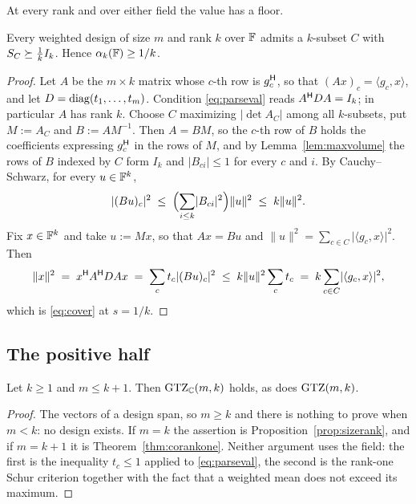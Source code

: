 At every rank and over either field the value has a floor.

\begin{proposition}[Lean]\label{prop:rankfloor}
Every weighted design of size $m$ and rank $k$ over $\mathbb{F}$ admits a
$k$-subset $C$ with $S_{C}\succeq\frac1k I_k$.  Hence $\alpha_k(\mathbb{F})\ge1/k$.
\end{proposition}

\begin{proof}
Let $A$ be the $m\times k$ matrix whose $c$-th row is $g_c^{\mathsf{H}}$, so that
$(Ax)_c=\langle g_c,x\rangle$, and let $D=\operatorname{diag}(t_1,\dots,t_m)$.
Condition \eqref{eq:parseval} reads $A^{\mathsf{H}} DA=I_k$; in particular $A$ has
rank $k$.  Choose $C$ maximizing $\lvert\det A_C\rvert$ among all
$k$-subsets, put $M:=A_C$ and $B:=AM^{-1}$.  Then $A=BM$, so the $c$-th
row of $B$ holds the coefficients expressing $g_c^{\mathsf{H}}$ in the rows of $M$,
and by Lemma~\ref{lem:maxvolume} the rows of $B$ indexed by $C$ form $I_k$
and $\lvert B_{ci}\rvert\le1$ for every $c$ and $i$.  By
Cauchy--Schwarz, for every $u\in\mathbb{F}^k$,
\[
  \lvert (Bu)_c\rvert^{2}
  \;\le\;\Bigl(\sum_{i\le k}\lvert B_{ci}\rvert^{2}\Bigr)\lVert u\rVert^{2}
  \;\le\;k\lVert u\rVert^{2} .
\]
Fix $x\in\mathbb{F}^k$ and take $u:=Mx$, so that $Ax=Bu$ and
$\lVert u\rVert^2=\sum_{c\in C}\lvert\langle g_c,x\rangle\rvert^2$.  Then
\[
  \lVert x\rVert^{2}
  \;=\;x^{\mathsf{H}} A^{\mathsf{H}} DAx
  \;=\;\sum_c t_c\lvert (Bu)_c\rvert^{2}
  \;\le\;k\lVert u\rVert^{2}\sum_c t_c
  \;=\;k\sum_{c\in C}\lvert\langle g_c,x\rangle\rvert^{2},
\]
which is \eqref{eq:cover} at $s=1/k$.
\end{proof}

\subsection{The positive half}\label{sec:cpositive}

\begin{proposition}[Lean]\label{prop:cpositive}
Let $k\ge1$ and $m\le k+1$.  Then $\mathrm{GTZ}_{\mathbb{C}}(m,k)$ holds, as does
$\mathrm{GTZ}(m,k)$.
\end{proposition}

\begin{proof}
The vectors of a design span, so $m\ge k$ and there is nothing to prove
when $m<k$: no design exists.  If $m=k$ the assertion is
Proposition~\ref{prop:sizerank}, and if $m=k+1$ it is
Theorem~\ref{thm:corankone}.  Neither argument uses the field: the first
is the inequality $t_c\le1$ applied to \eqref{eq:parseval}, the second is
the rank-one Schur criterion together with the fact that a weighted mean
does not exceed its maximum.
\end{proof}

